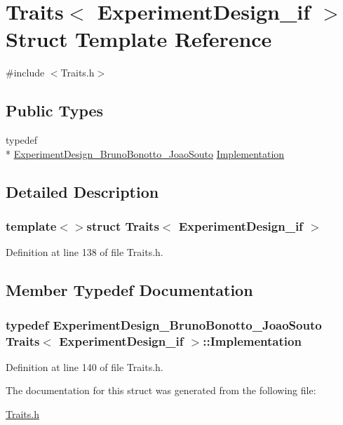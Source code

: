\hypertarget{struct_traits_3_01_experiment_design__if_01_4}{\section{Traits$<$ Experiment\-Design\-\_\-if $>$ Struct Template Reference}
\label{struct_traits_3_01_experiment_design__if_01_4}
}


{\ttfamily \#include $<$Traits.\-h$>$}

\subsection*{Public Types}
\begin{DoxyCompactItemize}
\item 
typedef \\*
\hyperlink{class_experiment_design___bruno_bonotto___joao_souto}{Experiment\-Design\-\_\-\-Bruno\-Bonotto\-\_\-\-Joao\-Souto} \hyperlink{struct_traits_3_01_experiment_design__if_01_4_aedae421d21e7ed934de40ac8be6f8590}{Implementation}
\end{DoxyCompactItemize}


\subsection{Detailed Description}
\subsubsection*{template$<$$>$struct Traits$<$ Experiment\-Design\-\_\-if $>$}



Definition at line 138 of file Traits.\-h.



\subsection{Member Typedef Documentation}
\hypertarget{struct_traits_3_01_experiment_design__if_01_4_aedae421d21e7ed934de40ac8be6f8590}{
\subsubsection[{Implementation}]{\setlength{\rightskip}{0pt plus 5cm}typedef {\bf Experiment\-Design\-\_\-\-Bruno\-Bonotto\-\_\-\-Joao\-Souto} {\bf Traits}$<$ {\bf Experiment\-Design\-\_\-if} $>$\-::{\bf Implementation}}}\label{struct_traits_3_01_experiment_design__if_01_4_aedae421d21e7ed934de40ac8be6f8590}


Definition at line 140 of file Traits.\-h.



The documentation for this struct was generated from the following file\-:\begin{DoxyCompactItemize}
\item 
\hyperlink{_traits_8h}{Traits.\-h}\end{DoxyCompactItemize}
